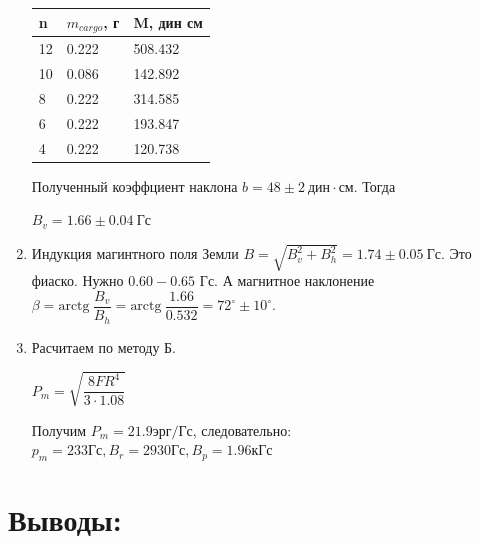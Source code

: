 \documentclass[a4paper,12pt]{article}
\begin{document}
\begin{enumerate}
\begin{minipage}{0.4\textwidth}
\begin{tabular}{|l|l|l|}
\hline
n  & $m_{cargo}$, г  & M, дин см \\ \hline
12 & 0.222 & 508.432         \\ \hline
10 & 0.086 & 142.892        \\ \hline
8  & 0.222 & 314.585       \\ \hline
6  & 0.222 & 193.847        \\ \hline
4  & 0.222 & 120.738        \\ \hline
\end{tabular}
\end{minipage}
\begin{minipage}{0.6\textwidth}
\end{minipage}
Полученный коэффциент наклона $b = 48 \pm 2~\text{дин}\cdot\text{см}$. Тогда
\begin{center}
\textbf{$B_v = 1.66 \pm 0.04~\text{Гс}$}
\end{center} 
\item Индукция магинтного поля Земли $B = \sqrt{B_v^2 + B_h^2} = 1.74 \pm 0.05~\text{Гс}$. Это фиаско. Нужно $0.60 - 0.65$ Гс.
А магнитное наклонение $\beta= \text{arctg}~\dfrac{B_v}{B_h} = \text{arctg}~\dfrac{1.66}{0.532} = 72^\circ\pm 10^\circ$.
\item Расчитаем по методу Б.
\begin{center}
$P_m = \sqrt{\dfrac{8FR^4}{3\cdot1.08}}$
\end{center}
Получим $P_m = 21.9 \text{эрг/Гс}$, следовательно: $p_m = 233 \text{Гс}, B_r = 2930 \text{Гс},  B_p = 1.96 \text{кГс}$
\end{enumerate}
\section{Выводы:}

\newpage
\end{document}
